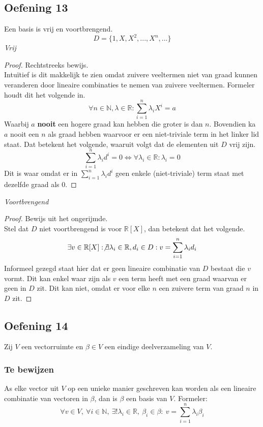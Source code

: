 \documentclass[lineaire_algebra_oplossingen.tex]{subfiles}
\begin{document}
\subsection{Oefening 13}
Een basis is vrij en voortbrengend.
\[
D = \{1,X,X^2,...,X^n,...\}
\]
\emph{Vrij}
\begin{proof}
Rechtstreeks bewijs.\\
Intu\"itief is dit makkelijk te zien omdat zuivere veeltermen niet van graad kunnen veranderen door lineaire combinaties te nemen van zuivere veeltermen. Formeler houdt dit het volgende in.
\[
\forall n\in \mathbb{N},\lambda \in \mathbb{R}: \sum_{i=1}^n\lambda_iX^i = a
\] 
Waarbij $a$ \textbf{nooit} een hogere graad kan hebben die groter is dan $n$. Bovendien ka $a$ nooit een $n$ als graad hebben waarvoor er een niet-triviale term in het linker lid staat.
Dat betekent het volgende, waaruit volgt dat de elementen uit $D$ vrij zijn.
\[
\sum_{i=1}^n\lambda_id^i = 0 \Leftrightarrow \forall \lambda_i \in \mathbb{R}: \lambda_i =0
\]
Dit is waar omdat er in $\sum_{i=1}^n\lambda_id^i$ geen enkele (niet-triviale) term staat met dezelfde graad als $0$.
\end{proof}
\emph{Voortbrengend}\\
\begin{proof}
Bewijs uit het ongerijmde.\\
Stel dat $D$ niet voortbrengend is voor $\mathbb{R}[X]$, dan betekent dat het volgende.
\[
\exists v \in \mathbb{R}[X]: \not\exists \lambda_i\in \mathbb{R},d_i \in D: v = \sum_{i=1}^n\lambda_id_i
\]
Informeel gezegd staat hier dat er geen lineaire combinatie van $D$ bestaat die $v$ vormt.
Dit kan enkel waar zijn als $v$ een term heeft met een graad waarvan er geen in $D$ zit. Dit kan niet, omdat er voor elke $n$ een zuivere term van graad $n$ in $D$ zit.
\end{proof}

\subsection{Oefening 14}
Zij $V$ een vectorruimte en $\beta \in V$ een eindige deelverzameling van $V$.
\subsubsection*{Te bewijzen}
As elke vector uit $V$ op een unieke manier geschreven kan worden als een lineaire combinatie van vectoren in $\beta$, dan is $\beta$ een basis van $V$.
Formeler:
\[
\forall v \in V,\ \forall i\in \mathbb{N},\ \exists!\lambda_i\in \mathbb{R},\ \beta_i \in \beta:\ v=\sum_{i = 1}^n\lambda_i\beta_i
\]
\end{document}
